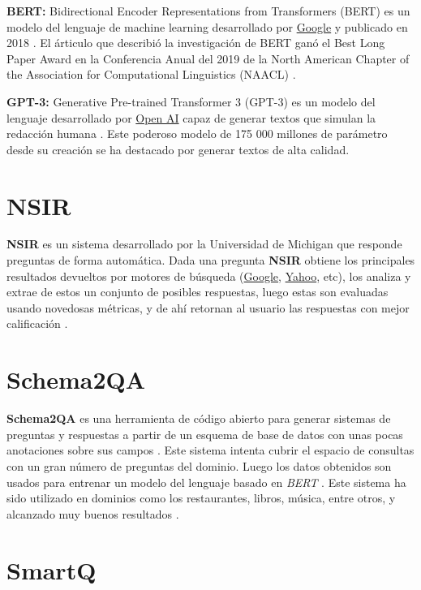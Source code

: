 \textbf{BERT:} Bidirectional Encoder Representations from Transformers (BERT) es un modelo del lenguaje de machine learning desarrollado por \href{google.com}{Google} y publicado en 2018 \cite{bert}. El árticulo que describió la investigación de BERT ganó el Best Long Paper Award en la Conferencia Anual del 2019 de la North American Chapter of the Association for Computational Linguistics (NAACL) \cite{bert_award}.
\newline

\textbf{GPT-3:} Generative Pre-trained Transformer 3 (GPT-3) es un modelo del lenguaje desarrollado por \href{https://openai.com/}{Open AI} capaz de generar textos que simulan la redacción humana \cite{gpt}. Este poderoso modelo de 175 000 millones de parámetro desde su creación se ha destacado por generar textos de alta calidad.

\section{NSIR}

\textbf{NSIR} es un sistema desarrollado por la Universidad de Michigan que responde preguntas de forma automática. Dada una pregunta \textbf{NSIR} obtiene los principales resultados devueltos por motores de búsqueda (\href{google.com}{Google}, \href{yahoo.com}{Yahoo}, etc), los analiza y extrae de estos un conjunto de posibles respuestas, luego estas son evaluadas usando novedosas métricas, y de ahí retornan al usuario las respuestas con mejor calificación \cite{nsir}.

\section{Schema2QA}

\textbf{Schema2QA} es una herramienta de código abierto para generar sistemas de preguntas y respuestas a partir de un esquema de base de datos con unas pocas anotaciones sobre sus campos \cite{s2qa}. Este sistema intenta cubrir el espacio de consultas con un gran número de preguntas del dominio. Luego los datos obtenidos son usados para entrenar un modelo del lenguaje basado en \textit{BERT} \cite{bert}. Este sistema ha sido utilizado en dominios como los restaurantes, libros, música, entre otros, y alcanzado muy buenos resultados \cite{s2qa}.


\section{SmartQ}

